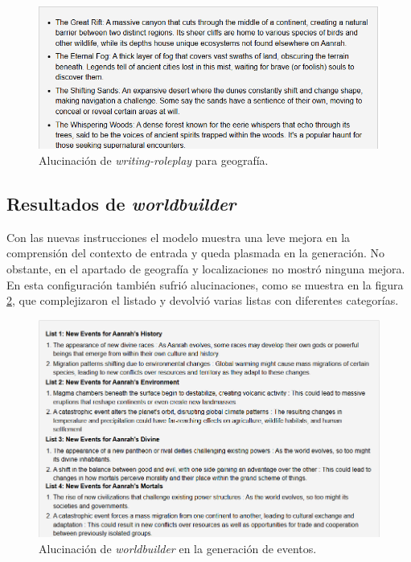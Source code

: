 \begin{figure}[htbp]
	\centering
	\includegraphics[width=1\textwidth]{./Figures/writing-prompt-geography.png}
	\caption{Alucinación de \textit{writing-roleplay} para geografía.}
	\label{fig:writing-geography}
\end{figure}

\subsection{Resultados de \textit{worldbuilder}}
Con las nuevas instrucciones el modelo muestra
una leve mejora en la comprensión del contexto de entrada
y queda plasmada en la generación.
No obstante, en el apartado de geografía y localizaciones no mostró ninguna mejora.
En esta configuración también sufrió alucinaciones, como se muestra en la figura \ref{fig:worldbuilder-hallucination},
que complejizaron el listado y devolvió varias listas con diferentes categorías.

\begin{figure}[htbp]
	\centering
	\includegraphics[width=1\textwidth]{./Figures/worldbuilder-hallucination-events.png}
	\caption{Alucinación de \textit{worldbuilder} en la generación de eventos.}
	\label{fig:worldbuilder-hallucination}
\end{figure}

